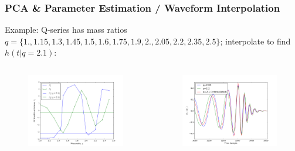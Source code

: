 \documentclass{beamer}
\begin{document}
\begin{frame}
    \frametitle{PCA \& Parameter Estimation / Waveform Interpolation}
    Example: Q-series has mass ratios $q=\{1.  ,  1.15,  1.3 ,  1.45,  1.5 ,  1.6
    ,  1.75,  1.9 ,  2.  , 2.05,  2.2 ,  2.35,  2.5\}$; interpolate to find
    $h(t|q=2.1)$:

    \begin{columns}[]
        \begin{center}
        \begin{figure}
            \vspace*{-0.5cm}
            \includegraphics[scale=0.3]{PC_coeff_example.png} 
        \end{figure}
        \end{center}

        \begin{center}
        \begin{figure}
            \vspace*{-0.5cm}
            \includegraphics[scale=0.3]{waveform_interp_example.png} 
        \end{figure}
        \end{center}
    \end{columns}

\end{frame}
\end{document}
